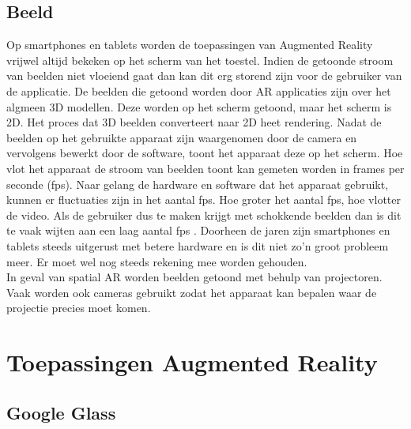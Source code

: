 \documentclass[pdftex,a4paper,12pt,twoside]{report}
\begin{document}
	\subsection{Beeld}
	Op smartphones en tablets worden de toepassingen van Augmented Reality vrijwel altijd bekeken op het scherm van het toestel. Indien de getoonde stroom van beelden niet vloeiend gaat dan kan dit erg storend zijn voor de gebruiker van de applicatie. De beelden die getoond worden door AR applicaties zijn over het algmeen 3D modellen. Deze worden op het scherm getoond, maar het scherm is 2D. Het proces dat 3D beelden converteert naar 2D heet rendering. Nadat de beelden op het gebruikte apparaat zijn waargenomen door de camera en vervolgens bewerkt door de software, toont het apparaat deze op het scherm. Hoe vlot het apparaat de stroom van beelden toont kan gemeten worden in frames per seconde (fps). Naar gelang de hardware en software dat het apparaat gebruikt, kunnen er fluctuaties zijn in het aantal fps. Hoe groter het aantal fps, hoe vlotter de video. Als de gebruiker dus te maken krijgt met schokkende beelden dan is dit te vaak wijten aan een laag aantal fps . Doorheen de jaren zijn smartphones en tablets steeds uitgerust met betere hardware en is dit niet zo'n groot probleem meer. Er moet wel nog steeds rekening mee worden gehouden.\\
	
	In geval van spatial AR worden beelden getoond met behulp van projectoren. Vaak worden ook cameras gebruikt zodat het apparaat kan bepalen waar de projectie precies moet komen.

\section{Toepassingen Augmented Reality}
	
\subsection{Google Glass}
\label{sec:googleglass}
\end{document}
